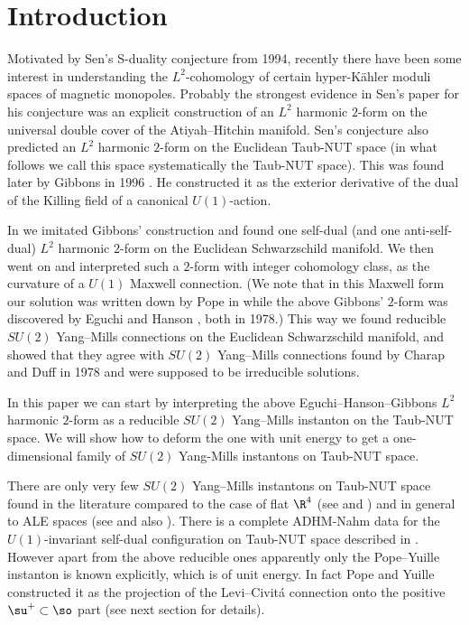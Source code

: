 \documentclass[a4paper,12pt,draft]{article}
\begin{document}
\section{Introduction}
Motivated by Sen's S-duality conjecture \cite{sen} from 1994,  
recently there have been some interest in understanding the $L^2$-cohomology of
certain hyper-K\"ahler moduli spaces of magnetic monopoles. Probably the 
strongest evidence in Sen's paper for his conjecture was
an explicit construction of an $L^2$ harmonic $2$-form on the universal 
double cover of the Atiyah--Hitchin manifold. Sen's conjecture also
predicted an $L^2$ harmonic $2$-form on the Euclidean Taub-NUT space (in
what follows we call this space systematically the Taub-NUT
space). This was found later by Gibbons in 1996 \cite{gib}. He constructed
it as the exterior derivative of the dual of the Killing field of a
canonical $U(1)$-action. 

In \cite{ete-hau} we imitated Gibbons' construction and found one self-dual
(and one anti-self-dual) $L^2$ harmonic $2$-form on the Euclidean 
Schwarzschild manifold. We then went on and interpreted such a $2$-form
with integer cohomology class, as the curvature of a $U(1)$ Maxwell
connection. (We note that in this Maxwell form our solution was written 
down by Pope in \cite{pop} while the above Gibbons' $2$-form
was discovered by Eguchi and Hanson \cite{egu-han}, both in
1978.) This way we found reducible $SU(2)$ Yang--Mills connections on the
Euclidean Schwarzschild manifold, and showed that they agree with $SU(2)$
Yang--Mills connections found by Charap and Duff in 1978 \cite{cha-duf}
and were supposed to be irreducible solutions. 

In this paper we can start by interpreting the above
Eguchi--Hanson--Gibbons $L^2$ harmonic $2$-form as a reducible $SU(2)$
Yang--Mills instanton on the Taub-NUT space. 
We will show how to deform the one with unit energy to get a
one-dimensional family of $SU(2)$ Yang-Mills instantons on Taub-NUT space. 

There are only very few $SU(2)$ Yang--Mills instantons on Taub-NUT space
found in the literature compared to the case of flat $\R^4$ (see
\cite{jac-noh-reb} and \cite{ati-dri-hit-man}) and
in general to ALE spaces (see \cite{kro-nak} and also \cite{bia-fuc-ros-mar}).
There is a complete ADHM-Nahm data for the
$U(1)$-invariant self-dual configuration on Taub-NUT space described in
\cite{che-kap}.  
However apart from the above reducible ones apparently only the Pope--Yuille
instanton \cite{pop-yui} is known explicitly, which is of unit energy. 
In fact Pope and Yuille constructed it as the projection of the
Levi--Civit\'a connection onto the positive $\su^+\subset\so$ part (see
next section for details). 
\end{document}

